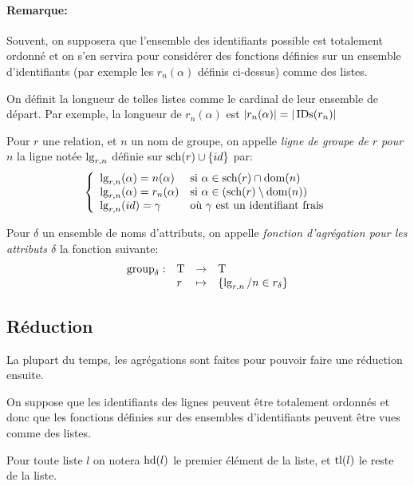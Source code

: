 \paragraph{Remarque:}
Souvent, on supposera que l'ensemble des identifiants possible
est totalement ordonné et on s'en servira pour considérer
des fonctions définies sur un ensemble d'identifiants
(par exemple les $r_n(\alpha)$ définis ci-dessus) 
comme des listes.

On définit la longueur de telles listes comme le cardinal
de leur ensemble de départ.
Par exemple, la longueur de $r_n(\alpha)$
est $|r_n(\alpha)| = |\operatorname{IDs}(r_n)|$

\begin{defi}
	Pour $r$ une relation, et $n$ un nom de groupe,
	on appelle \emph{ligne de groupe de $r$ pour $n$}
	la ligne notée $\operatorname{lg}_{r,n}$ définie sur $\operatorname{sch}(r) \cup \{id\}$ par:
	$$
	\left\lbrace
	\begin{array}{ll}
	\operatorname{lg}_{r, n}(\alpha) = n(\alpha) & \text{si $\alpha \in \operatorname{sch}(r) \cap \operatorname{dom}(n)$} \\
	\operatorname{lg}_{r, n}(\alpha) = r_n(\alpha) & \text{si $\alpha \in (\operatorname{sch}(r) \setminus \operatorname{dom}(n))$} \\
	\operatorname{lg}_{r, n}(id) = \gamma & \text{où $\gamma$ est un identifiant frais}
	\end{array}
	\right.
	$$ 
\end{defi}

\begin{defi}
	Pour $\delta$ un ensemble de noms d'attributs,
	on appelle \emph{fonction d'agrégation pour les attributs $\delta$}
	la fonction suivante:
	$$
	\begin{array}{llcl}
	\operatorname{group}_{\delta}: & \operatorname{T} & \rightarrow &  \operatorname{T} \\
			& r & \mapsto & \{ \operatorname{lg}_{r,n} / n \in r_\delta \}
	\end{array}
	$$
\end{defi}

\subsection*{Réduction}
La plupart du temps, les agrégations sont faites pour pouvoir faire une
réduction ensuite.

On suppose que les identifiants des lignes peuvent être totalement ordonnés
et donc que les fonctions définies sur des ensembles d'identifiants peuvent
être vues comme des listes.

Pour toute liste $l$ on notera $\operatorname{hd}(l)$ le premier élément de la liste,
et $\operatorname{tl}(l)$ le reste de la liste.

